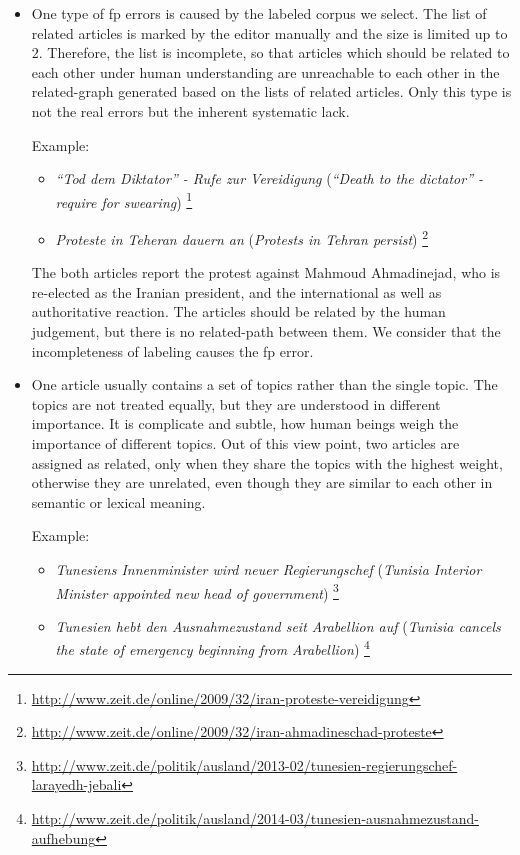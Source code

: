 \begin{itemize}
    \item One type of fp errors is caused by the labeled corpus we select. The list of related articles is marked by the editor manually and the size is limited up to $2$. Therefore, the list is incomplete, so that articles which should be related to each other under human understanding are unreachable to each other in the related-graph generated based on the lists of related articles. Only this type is not the real errors but the inherent systematic lack. 
    
    Example: 
    \begin{itemize}
        \item \textit{``Tod dem Diktator'' - Rufe zur Vereidigung} (\textit{``Death to the dictator'' - require for swearing}) \footnote{\url{http://www.zeit.de/online/2009/32/iran-proteste-vereidigung}}
        \item \textit{Proteste in Teheran dauern an} (\textit{Protests in Tehran persist}) \footnote{\url{http://www.zeit.de/online/2009/32/iran-ahmadineschad-proteste}}
    \end{itemize}
    The both articles report the protest against Mahmoud Ahmadinejad, who is re-elected as the Iranian president, and the international as well as authoritative reaction. The articles should be related by the human judgement, but there is no related-path between them. We consider that the incompleteness of labeling causes the fp error. 
    
    \item One article usually contains a set of topics rather than the single topic. The topics are not treated equally, but they are understood in different importance. It is complicate and subtle, how human beings weigh the importance of different topics. Out of this view point, two articles are assigned as related, only when they share the topics with the highest weight, otherwise they are unrelated, even though they are similar to each other in semantic or lexical meaning. 
    
    Example:
    \begin{itemize}
        \item \textit{Tunesiens Innenminister wird neuer Regierungschef} (\textit{Tunisia Interior Minister appointed new head of government}) \footnote{\url{http://www.zeit.de/politik/ausland/2013-02/tunesien-regierungschef-larayedh-jebali}}
        \item \textit{Tunesien hebt den Ausnahmezustand seit Arabellion auf} (\textit{Tunisia cancels the state of emergency beginning from Arabellion}) \footnote{\url{http://www.zeit.de/politik/ausland/2014-03/tunesien-ausnahmezustand-aufhebung}}
    \end{itemize}
    

\end{itemize}
